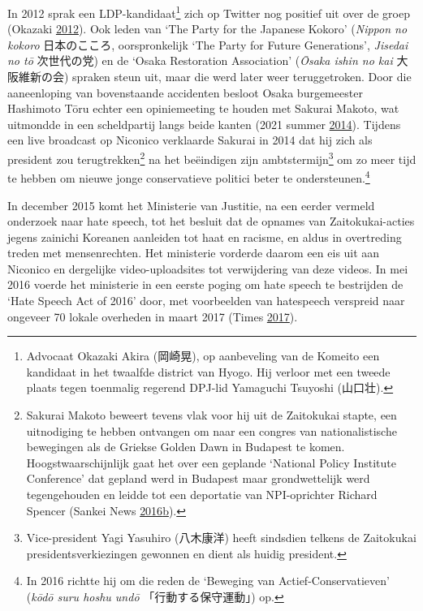 \documentclass[10.5pt,dutch,]{article}
\begin{document}
In 2012 sprak een LDP-kandidaat\footnote{Advocaat Okazaki Akira
  (岡崎晃), op aanbeveling van de Komeito een kandidaat in het twaalfde
  district van Hyogo. Hij verloor met een tweede plaats tegen toenmalig
  regerend DPJ-lid Yamaguchi Tsuyoshi (山口壮).} zich op Twitter nog
positief uit over de groep (Okazaki
\protect\hyperlink{ref-okazakiux5ftwitterux5f2012}{2012}). Ook leden van
`The Party for the Japanese Kokoro' (\emph{Nippon no kokoro}
日本のこころ, oorspronkelijk `The Party for Future Generations',
\emph{Jisedai no tō} 次世代の党) en de `Osaka Restoration Association'
(\emph{Ōsaka ishin no kai} 大阪維新の会) spraken steun uit, maar die
werd later weer teruggetroken. Door die aaneenloping van bovenstaande
accidenten besloot Osaka burgemeester Hashimoto Tōru echter een
opiniemeeting te houden met Sakurai Makoto, wat uitmondde in een
scheldpartij langs beide kanten (2021 summer
\protect\hyperlink{ref-2021ux5fsummerux5fhashimotoux5f2014}{2014}).
Tijdens een live broadcast op Niconico verklaarde Sakurai in 2014 dat
hij zich als president zou terugtrekken\footnote{Sakurai Makoto beweert
  tevens vlak voor hij uit de Zaitokukai stapte, een uitnodiging te
  hebben ontvangen om naar een congres van nationalistische bewegingen
  als de Griekse Golden Dawn in Budapest te komen. Hoogstwaarschijnlijk
  gaat het over een geplande `National Policy Institute Conference' dat
  gepland werd in Budapest maar grondwettelijk werd tegengehouden en
  leidde tot een deportatie van NPI-oprichter Richard Spencer (Sankei News
  \protect\hyperlink{ref-sankeiux5fnewsux5ftokyochiji-senux5f2016-1}{2016}\protect\hyperlink{ref-sankeiux5fnewsux5ftokyochiji-senux5f2016-1}{b}).}
na het beëindigen zijn ambtstermijn\footnote{Vice-president Yagi
  Yasuhiro (八木康洋) heeft sindsdien telkens de Zaitokukai
  presidentsverkiezingen gewonnen en dient als huidig president.} om zo
meer tijd te hebben om nieuwe jonge conservatieve politici beter te
ondersteunen.\footnote{In 2016 richtte hij om die reden de `Beweging van
  Actief-Conservatieven' (\emph{kōdō suru hoshu undō}
  「行動する保守運動」) op.}

In december 2015 komt het Ministerie van Justitie, na een eerder vermeld
onderzoek naar hate speech, tot het besluit dat de opnames van
Zaitokukai-acties jegens zainichi Koreanen aanleiden tot haat en
racisme, en aldus in overtreding treden met mensenrechten. Het
ministerie vorderde daarom een eis uit aan Niconico en dergelijke
video-uploadsites tot verwijdering van deze videos. In mei 2016 voerde
het ministerie in een eerste poging om hate speech te bestrijden de
`Hate Speech Act of 2016' door, met voorbeelden van hatespeech verspreid
naar ongeveer 70 lokale overheden in maart 2017 (Times
\protect\hyperlink{ref-theux5fjapanux5ftimesux5fjusticeux5f2017}{2017}).
\end{document}

